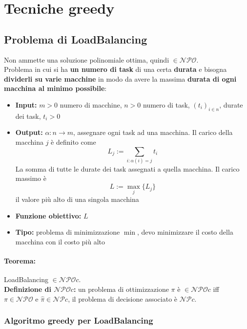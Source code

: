 \section{Tecniche greedy}

\subsection{Problema di LoadBalancing}
Non ammette una soluzione polinomiale ottima, quindi $\in \mathcal{NPO}$.\\

Problema in cui si ha \textbf{un numero di task} di una certa \textbf{durata} e bisogna \textbf{dividerli su varie macchine} in modo da avere la massima \textbf{durata di ogni macchina al minimo possibile}:
\begin{itemize}
	\item \textbf{Input:} $m > 0$ numero di macchine, $n>0$ numero di task, $(t_i)_{i \in n}$, durate dei task, $t_i > 0$
	
	\item \textbf{Output:} $\alpha: n \rightarrow m$, assegnare ogni task ad una macchina. Il carico della macchina $j$ è definito come 
	$$ L_j := \sum_{i: \alpha (i) = j} t_i$$
	La somma di tutte le durate dei task assegnati a quella macchina. Il carico massimo è
	$$ L := \max_j \{L_j\}$$ 
	il valore più alto di una singola macchina
	
	\item \textbf{Funzione obiettivo:} $L$
	
	\item \textbf{Tipo:} problema di minimizzazione $\min$, devo minimizzare il costo della macchina con il costo più alto
\end{itemize}

\paragraph{Teorema:} LoadBalancing $\in \mathcal{NPO}c$.\\

\textbf{Definizione di $\mathcal{NPO}c$:} un problema di ottimizzazione $\pi$ è $\in \mathcal{NPO}c$ iff $\pi \in \mathcal{NPO}$ e $\hat{\pi} \in \mathcal{NP}c$, il problema di decisione associato è $\mathcal{NP}c$.\\

\newpage

\subsubsection{Algoritmo greedy per LoadBalancing}

